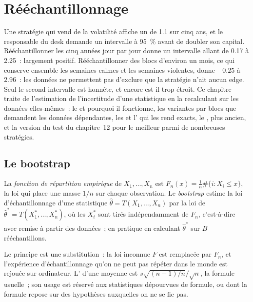 \chapter{Rééchantillonnage}\label{ch:qm:resampling}

Une stratégie qui vend de la volatilité affiche un  de 1.1 sur cinq ans, et le responsable du desk demande un intervalle à 95~\%
avant de doubler son capital. Rééchantillonner les cinq années jour par jour donne un intervalle allant de 0.17 à 2.25~: largement positif.
Rééchantillonner des blocs d'environ un mois, ce qui conserve ensemble les semaines calmes et les semaines violentes, donne $-0.25$ à $2.96$~: les données
ne permettent pas d'exclure que la stratégie n'ait aucun edge. Seul le second intervalle est honnête, et encore est-il trop étroit. Ce chapitre traite de
l'estimation de l'incertitude d'une statistique en la recalculant sur les données elles-mêmes~: le  et pourquoi il fonctionne, les variantes par blocs
que demandent les données dépendantes, les  et l' qui les rend exacts, le , plus ancien, et la
version  du test du chapitre~12 pour le meilleur parmi de nombreuses stratégies.

\section{Le bootstrap}

\begin{definition}\label{def:qm:resampling:bootstrap}
La \emph{fonction de répartition empirique} de $X_1, \dots, X_n$ est $F_n(x) = \frac1n\#\{i: X_i
\le x\}$, la loi qui place une masse $1/n$ sur chaque observation. Le \emph{bootstrap} estime la loi d'échantillonnage d'une
statistique $\hat\theta = T(X_1, \dots, X_n)$ par la loi de $\hat\theta^* = T(X_1^*, \dots, X_n^*)$, où les $X_i^*$ sont tirés
indépendamment de $F_n$, c'est-à-dire avec remise à partir des données~; en pratique en calculant $\hat\theta^*$ sur $B$ rééchantillons.
\end{definition}

Le principe est une substitution~: la loi inconnue $F$ est remplacée par $F_n$, et l'expérience d'échantillonnage qu'on ne peut pas répéter dans
le monde est rejouée sur ordinateur. L'  d'une moyenne est $s\sqrt{(n - 1)/n}/\sqrt n$, la formule usuelle~; son usage
est réservé aux statistiques dépourvues de formule, ou dont la formule repose sur des hypothèses auxquelles on ne se fie pas.

